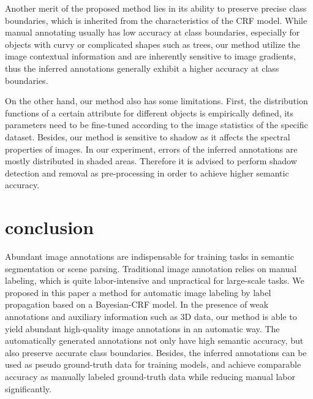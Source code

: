 Another merit of the proposed method lies in its ability to preserve precise class boundaries, which is inherited from the characteristics of the CRF model. While manual annotating usually has low accuracy at class boundaries, especially for objects with curvy or complicated shapes such as trees, our method utilize the image contextual information and are inherently sensitive to image gradients, thus the inferred annotations generally exhibit a higher accuracy at class boundaries. 

On the other hand, our method also has some limitations. First, the distribution functions of a certain attribute for different objects is empirically defined, its parameters need to be fine-tuned according to the image statistics of the specific dataset. Besides, our method is sensitive to shadow as it affects the spectral properties of images. In our experiment, errors of the inferred annotations are mostly distributed in shaded areas. Therefore it is advised to perform shadow detection and removal as pre-processing in order to achieve higher semantic accuracy.







\section{conclusion}
\label{sec:conc}
Abundant image annotations are indispensable for training tasks in semantic segmentation or scene parsing. Traditional image annotation relies on manual labeling, which is quite labor-intensive and unpractical for large-scale tasks. We proposed in this paper a method for automatic image labeling by label propagation based on a Bayesian-CRF model. In the presence of weak annotations and auxiliary information such as 3D data, our method is able to yield abundant high-quality image annotations in an automatic way. The automatically generated annotations not only have high semantic accuracy, but also preserve accurate class boundaries. Besides, the inferred annotations can be used as pseudo ground-truth data for training models, and achieve comparable accuracy as manually labeled ground-truth data while reducing manual labor significantly.


